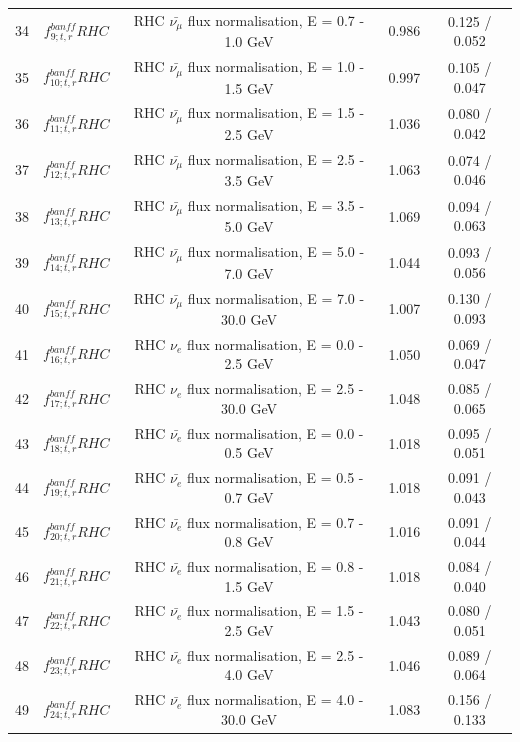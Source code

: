 \begin{tabular} { | c | c | c | c | c |  }
34 & $f_{9; t, r}^{banff} RHC$ & RHC $\bar{\nu_\mu}$ flux normalisation, E = 0.7 - 1.0 GeV & 0.986 & 0.125 / 0.052\\ 
35 & $f_{10; t, r}^{banff} RHC$ & RHC $\bar{\nu_\mu}$ flux normalisation, E = 1.0 - 1.5 GeV & 0.997 & 0.105 / 0.047\\ 
36 & $f_{11; t, r}^{banff} RHC$ & RHC $\bar{\nu_\mu}$ flux normalisation, E = 1.5 - 2.5 GeV & 1.036 & 0.080 / 0.042\\ 
37 & $f_{12; t, r}^{banff} RHC$ & RHC $\bar{\nu_\mu}$ flux normalisation, E = 2.5 - 3.5 GeV & 1.063 & 0.074 / 0.046\\ 
38 & $f_{13; t, r}^{banff} RHC$ & RHC $\bar{\nu_\mu}$ flux normalisation, E = 3.5 - 5.0 GeV & 1.069 & 0.094 / 0.063\\ 
39 & $f_{14; t, r}^{banff} RHC$ & RHC $\bar{\nu_\mu}$ flux normalisation, E = 5.0 - 7.0 GeV & 1.044 & 0.093 / 0.056\\ 
40 & $f_{15; t, r}^{banff} RHC$ & RHC $\bar{\nu_\mu}$ flux normalisation, E = 7.0 - 30.0 GeV & 1.007 & 0.130 / 0.093\\ 
41 & $f_{16; t, r}^{banff} RHC$ & RHC $\nu_e$ flux normalisation, E = 0.0 - 2.5 GeV & 1.050 & 0.069 / 0.047\\ 
42 & $f_{17; t, r}^{banff} RHC$ & RHC $\nu_e$ flux normalisation, E = 2.5 - 30.0 GeV & 1.048 & 0.085 / 0.065\\ 
43 & $f_{18; t, r}^{banff} RHC$ & RHC $\bar{\nu_e}$ flux normalisation, E = 0.0 - 0.5 GeV & 1.018 & 0.095 / 0.051\\ 
44 & $f_{19; t, r}^{banff} RHC$ & RHC $\bar{\nu_e}$ flux normalisation, E = 0.5 - 0.7 GeV & 1.018 & 0.091 / 0.043\\ 
45 & $f_{20; t, r}^{banff} RHC$ & RHC $\bar{\nu_e}$ flux normalisation, E = 0.7 - 0.8 GeV & 1.016 & 0.091 / 0.044\\ 
46 & $f_{21; t, r}^{banff} RHC$ & RHC $\bar{\nu_e}$ flux normalisation, E = 0.8 - 1.5 GeV & 1.018 & 0.084 / 0.040\\ 
47 & $f_{22; t, r}^{banff} RHC$ & RHC $\bar{\nu_e}$ flux normalisation, E = 1.5 - 2.5 GeV & 1.043 & 0.080 / 0.051\\ 
48 & $f_{23; t, r}^{banff} RHC$ & RHC $\bar{\nu_e}$ flux normalisation, E = 2.5 - 4.0 GeV & 1.046 & 0.089 / 0.064\\ 
49 & $f_{24; t, r}^{banff} RHC$ & RHC $\bar{\nu_e}$ flux normalisation, E = 4.0 - 30.0 GeV & 1.083 & 0.156 / 0.133\\ 

\hline

\end{tabular}